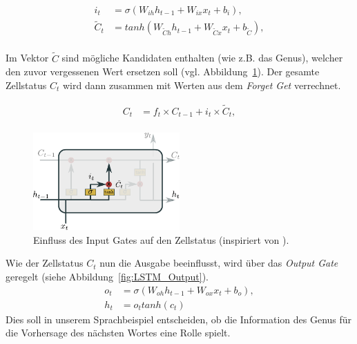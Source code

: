             \begin{equation}
                \begin{split}
                    i_t &= \sigma\left(W_{ih}h_{t-1} + W_{ix}x_t + b_i\right), \\
                    \tilde{C}_t &= tanh\left(W_{\tilde{C}h}h_{t-1} + W_{\tilde{C}x}x_t + b_{\tilde{C}}\right),\\
                \end{split}
            \end{equation}

            Im Vektor $\tilde{C}$ sind mögliche Kandidaten enthalten (wie z.B. das Genus), welcher den zuvor vergessenen Wert ersetzen soll (vgl. Abbildung~\ref{fig:LSTM_Input}).
            Der gesamte Zellstatus $C_t$ wird dann zusammen mit Werten aus dem \textit{Forget Get} verrechnet.

            \begin{equation}
                \begin{split}
                    C_t &=f_t\times C_{t-1} + i_t\times \tilde{C}_t, \\
                \end{split}
            \end{equation}

                \begin{figure}[ht]
                    \centering
                    \includegraphics[width=0.5\textwidth]{images/Illustrationen/LSTM_IG}
                    \caption{Einfluss des Input Gates auf den Zellstatus (inspiriert von \cite{OLAH2015}).}
                    \label{fig:LSTM_Input}
                \end{figure}
            
            Wie der Zellstatus $C_t$ nun die Ausgabe beeinflusst, wird über das \textit{Output Gate} geregelt (siehe Abbildung~\ref{fig:LSTM_Output}).
            \begin{equation}
                \begin{split}
                    o_t &= \sigma\left(W_{oh}h_{t-1} + W_{ox}x_t + b_o \right), \\
                    h_t &= o_ttanh\left(c_t\right)
                \end{split}
            \end{equation}
            Dies soll in unserem Sprachbeispiel entscheiden, ob die Information des Genus für die Vorhersage des nächsten Wortes eine Rolle spielt. \cite{GERS2000} \cite{OLAH2015}

